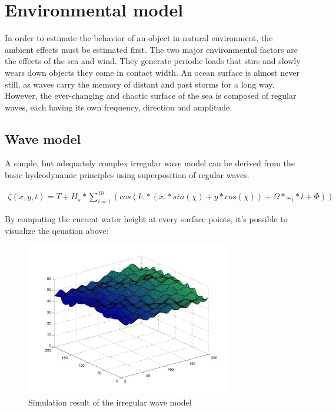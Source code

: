 ﻿\section{Environmental model}

In order to estimate the behavior of an object in natural environment, the ambient effects must be estimated first. The two major environmental factors are the effects of the sea and wind. They generate periodic loads that stirs and slowly wears down objects they come in contact width. An ocean surface is almost never still, as waves carry the memory of distant and past storms for a long way. However, the ever-changing and chaotic surface of the sea is composed of regular waves, each having its own frequency, direction and amplitude.

\subsection{Wave model} A simple, but adequately complex irregular wave model\cite[p.~14]{shipsim} can be derived from the basic hydrodynamic principles using superposition of regular waves\cite[p.~19]{hydromechanics}.

\begin{align}
		\zeta (x, y, t) = T + H_s * \sum_{i=1}^{10} (cos(k .* (x .* sin(\chi) + y * cos(\chi)) + \Omega * \omega{_i} * t + \Phi))
\end{align}

By computing the current water height at every surface points, it's possible to visualize the qeuation above:

\begin{figure}[H]
	\centering
	\includegraphics[width=0.8\textwidth]{fig/wavemodel}
	\caption{Simulation result of the irregular wave model}
	\label{fig:wavemodel}
\end{figure}

